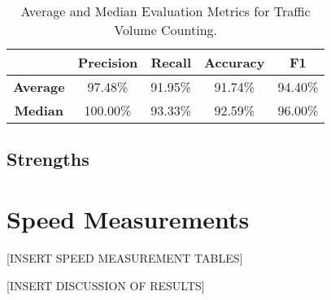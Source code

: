 \begin{table}[H]
\centering
\begin{tabular}{|ccccc|}
    \hline
                    &\textbf{Precision}&\textbf{Recall}&\textbf{Accuracy}&\textbf{F1}\\\hline
    \textbf{Average}&97.48\%&91.95\%&91.74\%&94.40\%\\\hline
    \textbf{Median}&100.00\%&93.33\%&92.59\%&96.00\%\\\hline
\end{tabular}
\caption{Average and Median Evaluation Metrics for Traffic Volume Counting.}
\label{table:averages}
\end{table}

\subsection{Strengths}



\section{Speed Measurements}

[INSERT SPEED MEASUREMENT TABLES]

[INSERT DISCUSSION OF RESULTS]

